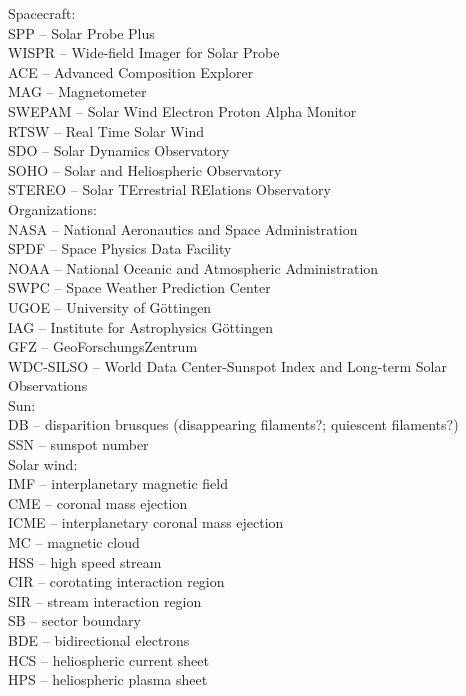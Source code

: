 Spacecraft:\\
SPP -- Solar Probe Plus\\
WISPR -- Wide-field Imager for Solar Probe\\
ACE -- Advanced Composition Explorer\\
	MAG -- Magnetometer\\
	SWEPAM -- Solar Wind Electron Proton Alpha Monitor\\
	RTSW -- Real Time Solar Wind\\
SDO -- Solar Dynamics Observatory\\
SOHO -- Solar and Heliospheric Observatory\\
STEREO -- Solar TErrestrial RElations Observatory\\

Organizations:\\
NASA -- National Aeronautics and Space Administration\\
	SPDF -- Space Physics Data Facility\\
NOAA -- National Oceanic and Atmospheric Administration\\
	SWPC -- Space Weather Prediction Center\\
UGOE -- University of Göttingen\\
IAG -- Institute for Astrophysics Göttingen\\
GFZ -- GeoForschungsZentrum\\
WDC-SILSO -- World Data Center-Sunspot Index and Long-term Solar Observations\\

Sun:\\
DB -- disparition brusques (disappearing filaments?; quiescent filaments?)\\
SSN -- sunspot number\\

Solar wind:\\
IMF -- interplanetary magnetic field\\
CME -- coronal mass ejection\\
ICME -- interplanetary coronal mass ejection\\
MC -- magnetic cloud\\
HSS -- high speed stream\\
CIR -- corotating interaction region\\
SIR -- stream interaction region\\
SB -- sector boundary\\
BDE -- bidirectional electrons\\
HCS -- heliospheric current sheet\\
HPS -- heliospheric plasma sheet\\

